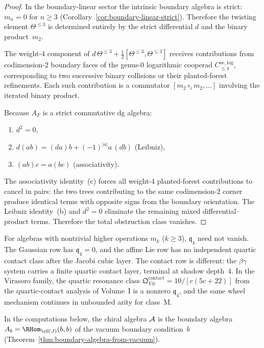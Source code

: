 \begin{proof}
In the boundary-linear sector the intrinsic boundary algebra is
strict: $m_n = 0$ for $n \geq 3$
(Corollary~\ref{cor:boundary-linear-strict}). Therefore the
twisting element $\Theta^{\leq 3}$ is determined entirely by the
strict differential $d$ and the binary product~$m_2$.

The weight-$4$ component of $d\,\Theta^{\leq 3}
+ \tfrac{1}{2}[\Theta^{\leq 3},\Theta^{\leq 3}]$ receives
contributions from codimension-$2$ boundary faces of the
genus-$0$ logarithmic cooperad $C^{\mathrm{oc,log}}_{\leq 4}$,
corresponding to two successive binary collisions or their
planted-forest refinements. Each such contribution is a
commutator $[m_2 \circ_i m_2,\ldots]$ involving the iterated
binary product.

Because $A_F$ is a strict commutative dg algebra:
\begin{enumerate}[label=(\alph*)]
\item $d^2 = 0$,
\item $d(ab) = (da)b + (-1)^{|a|} a\,(db)$ (Leibniz),
\item $(ab)c = a(bc)$ (associativity).
\end{enumerate}
The associativity identity~(c) forces all weight-$4$
planted-forest contributions to cancel in pairs: the two trees
contributing to the same codimension-$2$ corner produce
identical terms with opposite signs from the boundary orientation.
The Leibniz identity~(b) and $d^2 = 0$ eliminate the remaining
mixed differential--product terms. Therefore the total
obstruction class vanishes.
\end{proof}

\begin{remark}
\label{rem:quartic-contact-beyond-BL}
For algebras with nontrivial higher operations $m_k$ ($k \geq 3$),
$\mathfrak{q}_4$ need not vanish. The Gaussian row has
$\mathfrak{q}_4=0$, and the affine Lie row has no independent
quartic contact class after the Jacobi cubic layer. The contact row is
different: the $\beta\gamma$ system carries a finite quartic contact
layer, terminal at shadow depth~$4$. In the Virasoro family, the
quartic resonance class
$\mathfrak{Q}^{\mathrm{contact}}_{\mathrm{Vir}}=10/[c(5c+22)]$ from
the quartic-contact analysis of Volume~I is a nonzero
$\mathfrak{q}_4$, and the same wheel mechanism continues in
unbounded arity for class~M.
\end{remark}

In the computations below, the chiral algebra $\mathcal{A}$ is the boundary algebra $A_b = \RHom_{\cC(J)}(b,b)$ of the vacuum boundary condition~$b$ (Theorem~\ref{thm:boundary-algebra-from-vacuum}).

